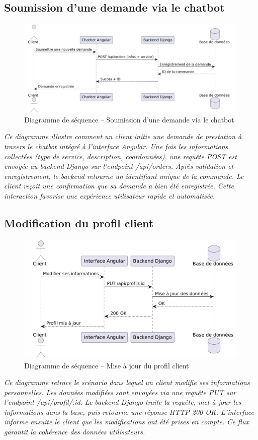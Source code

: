 \vspace{1em}

\subsection*{Soumission d’une demande via le chatbot}
\begin{figure}[H]
\centering
\includegraphics[width=0.90\linewidth]{figures/Séquence – Soumettre une demande via le chatbot.png}
\caption{Diagramme de séquence – Soumission d’une demande via le chatbot}
\end{figure}
\textit{Ce diagramme illustre comment un client initie une demande de prestation à travers le chatbot intégré à l’interface Angular. Une fois les informations collectées (type de service, description, coordonnées), une requête POST est envoyée au backend Django sur l’endpoint /api/orders. Après validation et enregistrement, le backend retourne un identifiant unique de la commande. Le client reçoit une confirmation que sa demande a bien été enregistrée. Cette interaction favorise une expérience utilisateur rapide et automatisée.}

\vspace{1em}

\subsection*{Modification du profil client}
\begin{figure}[H]
\centering
\includegraphics[width=0.85\linewidth]{figures/Séquence – Modification du profil client.png}
\caption{Diagramme de séquence – Mise à jour du profil client}
\end{figure}
\textit{Ce diagramme retrace le scénario dans lequel un client modifie ses informations personnelles. Les données modifiées sont envoyées via une requête PUT sur l’endpoint /api/profil/:id. Le backend Django traite la requête, met à jour les informations dans la base, puis retourne une réponse HTTP 200 OK. L’interface informe ensuite le client que les modifications ont été prises en compte. Ce flux garantit la cohérence des données utilisateurs.}


